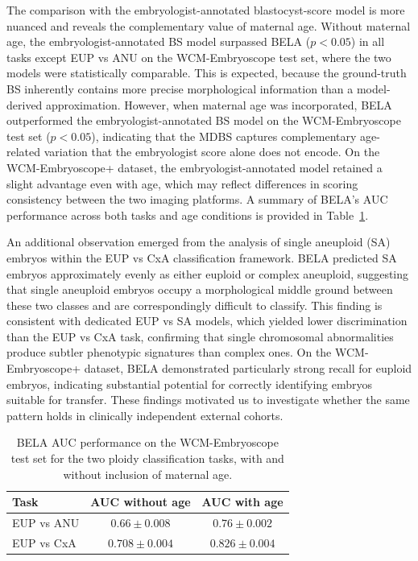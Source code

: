 \documentclass[11pt]{article}
\begin{document}
The comparison with the embryologist-annotated blastocyst-score model is more nuanced and reveals the complementary value of maternal age. Without maternal age, the embryologist-annotated BS model surpassed BELA ($p < 0.05$) in all tasks except EUP vs ANU on the WCM-Embryoscope test set, where the two models were statistically comparable. This is expected, because the ground-truth BS inherently contains more precise morphological information than a model-derived approximation. However, when maternal age was incorporated, BELA outperformed the embryologist-annotated BS model on the WCM-Embryoscope test set ($p < 0.05$), indicating that the MDBS captures complementary age-related variation that the embryologist score alone does not encode. On the WCM-Embryoscope+ dataset, the embryologist-annotated model retained a slight advantage even with age, which may reflect differences in scoring consistency between the two imaging platforms. A summary of BELA's AUC performance across both tasks and age conditions is provided in Table~\ref{tab:auc_wcm}.

An additional observation emerged from the analysis of single aneuploid (SA) embryos within the EUP vs CxA classification framework. BELA predicted SA embryos approximately evenly as either euploid or complex aneuploid, suggesting that single aneuploid embryos occupy a morphological middle ground between these two classes and are correspondingly difficult to classify. This finding is consistent with dedicated EUP vs SA models, which yielded lower discrimination than the EUP vs CxA task, confirming that single chromosomal abnormalities produce subtler phenotypic signatures than complex ones. On the WCM-Embryoscope+ dataset, BELA demonstrated particularly strong recall for euploid embryos, indicating substantial potential for correctly identifying embryos suitable for transfer. These findings motivated us to investigate whether the same pattern holds in clinically independent external cohorts.

\begin{table}[htbp]
\centering
\caption{BELA AUC performance on the WCM-Embryoscope test set for the two ploidy classification tasks, with and without inclusion of maternal age.}
\label{tab:auc_wcm}
\begin{tabular}{lcc}
\toprule
Task & AUC without age & AUC with age \\
\midrule
EUP vs ANU & $0.66 \pm 0.008$ & $0.76 \pm 0.002$ \\
EUP vs CxA & $0.708 \pm 0.004$ & $0.826 \pm 0.004$ \\
\bottomrule
\end{tabular}
\end{table}
\end{document}
